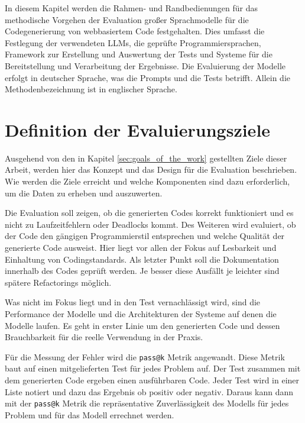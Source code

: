 In diesem Kapitel werden die Rahmen- und Randbedienungen für das methodische Vorgehen der Evaluation großer Sprachmodelle für die Codegenerierung von webbasiertem Code festgehalten. Dies umfasst die Festlegung der verwendeten LLMs, die geprüfte Programmiersprachen, Framework zur Erstellung und Auswertung der Tests und Systeme für die Bereitstellung und Verarbeitung der Ergebnisse. Die Evaluierung der Modelle erfolgt in deutscher Sprache, was die Prompts und die Tests betrifft. Allein die Methodenbezeichnung ist in englischer Sprache.

\section{Definition der Evaluierungsziele}

Ausgehend von den in Kapitel \ref{sec:goals_of_the_work} gestellten Ziele dieser Arbeit, werden hier das Konzept und das Design für die Evaluation beschrieben. Wie werden die Ziele erreicht und welche Komponenten sind dazu erforderlich, um die Daten zu erheben und auszuwerten.\vspace{0.2cm}

Die Evaluation soll zeigen, ob die generierten Codes korrekt funktioniert und es nicht zu Laufzeitfehlern oder Deadlocks kommt. Des Weiteren wird evaluiert, ob der Code den gängigen Programmierstil entsprechen und welche Qualität der generierte Code ausweist. Hier liegt vor allen der Fokus auf Lesbarkeit und Einhaltung von Codingstandards. Als letzter Punkt soll die Dokumentation innerhalb des Codes geprüft werden. Je besser diese Ausfällt je leichter sind spätere Refactorings möglich.\vspace{0.2cm}

Was nicht im Fokus liegt und in den Test vernachlässigt wird, sind die Performance der Modelle und die Architekturen der Systeme auf denen die Modelle laufen. Es geht in erster Linie um den generierten Code und dessen Brauchbarkeit für die reelle Verwendung in der Praxis.\vspace{0.2cm}

Für die Messung der Fehler wird die \texttt{pass@k} Metrik angewandt. Diese Metrik baut auf einen mitgelieferten Test für jedes Problem auf. Der Test zusammen mit dem generierten Code ergeben einen ausführbaren Code. Jeder Test wird in einer Liste notiert und dazu das Ergebnis ob positiv oder negativ. Daraus kann dann mit der \texttt{pass@k} Metrik die repräsentative Zuverlässigkeit des Modells für jedes Problem und für das Modell errechnet werden.\vspace{0.2cm}

